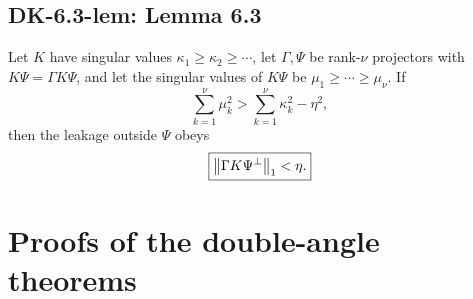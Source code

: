 \subsection*{DK-6.3-lem: Lemma 6.3}
Let $K$ have singular values $\kappa_1\ge\kappa_2\ge\cdots$, let $\Gamma,\Psi$ be rank-$\nu$ projectors with $K\Psi=\Gamma K\Psi$, and let the singular values of $K\Psi$ be $\mu_1\ge\cdots\ge\mu_\nu$.  If
\[
 \sum_{k=1}^{\nu}\mu_k^2
 >\sum_{k=1}^{\nu}\kappa_k^2-\eta^2,
\]
then the leakage outside $\Psi$ obeys
\[
 \boxed{\left\lVert \Gamma K\Psi^\perp\right\rVert_1<\eta.}
\]

\section{Proofs of the double-angle theorems}


